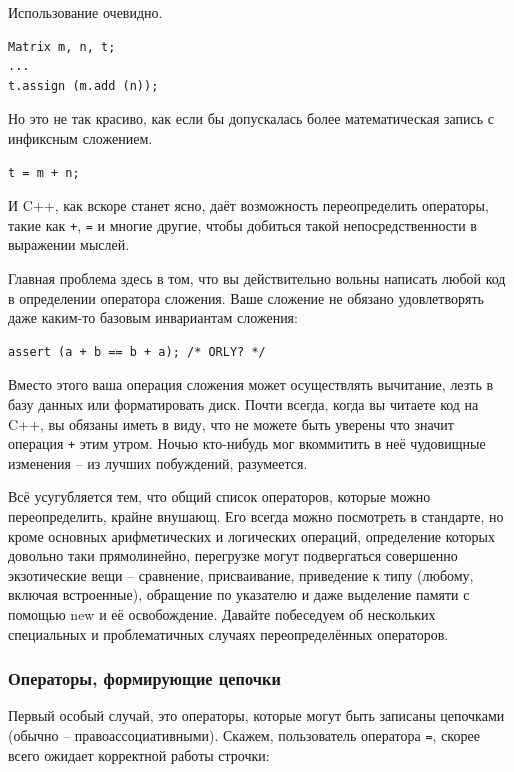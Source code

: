 \documentclass[a4paper,12pt,oneside]{article}
\begin{document}
Использование очевидно.

\begin{lstlisting}
Matrix m, n, t;
...
t.assign (m.add (n));
\end{lstlisting}

Но это не так красиво, как если бы допускалась более математическая запись с инфиксным сложением.

\begin{lstlisting}
t = m + n;
\end{lstlisting}

И C++, как вскоре станет ясно, даёт возможность переопределить операторы, такие как \lstinline!+!, \lstinline!=! и многие другие, чтобы добиться такой непосредственности в выражении мыслей.

Главная проблема здесь в том, что вы действительно вольны написать любой код в определении оператора сложения. Ваше сложение не обязано удовлетворять даже каким-то базовым инвариантам сложения:

\begin{lstlisting}
assert (a + b == b + a); /* ORLY? */
\end{lstlisting}

Вместо этого ваша операция сложения может осуществлять вычитание, лезть в базу данных или форматировать диск. Почти всегда, когда вы читаете код на C++, вы обязаны иметь в виду, что не можете быть уверены что значит операция \lstinline!+! этим утром. Ночью кто-нибудь мог вкоммитить в неё чудовищные изменения – из лучших побуждений, разумеется.

Всё усугубляется тем, что общий список операторов, которые можно переопределить, крайне внушающ. Его всегда можно посмотреть в стандарте, но кроме основных арифметических и логических операций, определение которых довольно таки прямолинейно, перегрузке могут подвергаться совершенно экзотические вещи – сравнение, присваивание, приведение к типу (любому, включая встроенные), обращение по указателю и даже выделение памяти с помощью new и её освобождение. Давайте побеседуем об нескольких специальных и проблематичных случаях переопределённых операторов.

\subsubsection{Операторы, формирующие цепочки}\label{ChainOps}

Первый особый случай, это операторы, которые могут быть записаны цепочками (обычно -- правоассоциативными). Скажем, пользователь оператора \lstinline!=!, скорее всего ожидает корректной работы строчки:
\end{document}

